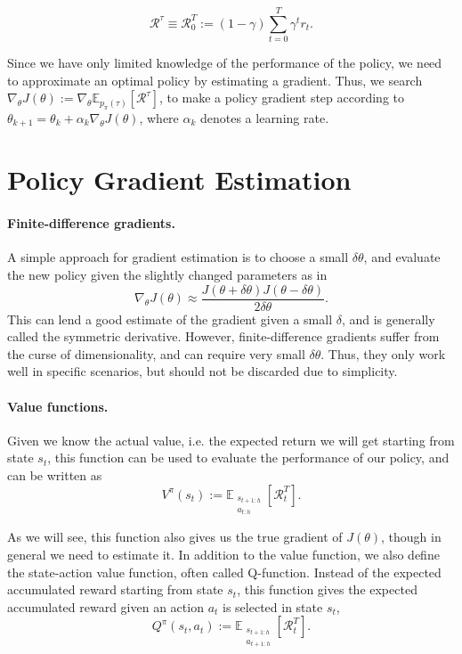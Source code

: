 \begin{equation}
  \mathcal{R}^\tau \equiv \mathcal{R}_0^T := (1-\gamma) \sum_{t=0}^{T} \gamma^t r_t.
  \label{eqn:acc-reward}
\end{equation}

Since we have only limited knowledge of the performance of the policy, we need to approximate an optimal policy by estimating a gradient. 
Thus, we search $\nabla_\theta J(\theta) := \nabla_\theta \mathbb{E}_{p_\pi(\tau)}\left[\mathcal{R}^\tau\right]$, to make a policy gradient step according to $\theta_{k+1} = \theta_k + \alpha_k \nabla_\theta J(\theta)$, where $\alpha_k$ denotes a learning rate. 

\section{Policy Gradient Estimation}
\label{sec:pge}

\paragraph{Finite-difference gradients.} 
A simple approach for gradient estimation is to choose a small $\delta\theta$, and evaluate the new policy given the slightly changed parameters as in 
\begin{equation}
	\nabla_\theta J(\theta) \approx \frac{J(\theta+\delta\theta)J(\theta-\delta\theta)}{2\delta\theta}.
\end{equation} 
This can lend a good estimate of the gradient given a small $\delta$, and is generally called the symmetric derivative. 
However, finite-difference gradients suffer from the curse of dimensionality, and can require very small $\delta\theta$.
Thus, they only work well in specific scenarios, but should not be discarded due to simplicity. 

\paragraph{Value functions.} 
Given we know the actual value, i.e. the expected return we will get starting from state $s_t$, this function can be used to evaluate the performance of our policy, and can be written as
\begin{equation}
	V^{\pi}(s_t) := \mathbb{E}_{\substack{s_{t+1:h} \\ a_{t:h}}}\left[\mathcal{R}_t^T\right].
	\label{eqn:v}
\end{equation}

As we will see, this function also gives us the true gradient of $J(\theta)$, though in general we need to estimate it. 
In addition to the value function, we also define the state-action value function, often called Q-function. 
Instead of the expected accumulated reward starting from state $s_t$, this function gives the expected accumulated reward given an action $a_t$ is selected in state $s_t$, 
\begin{equation}
	Q^{\pi}(s_t, a_t) := \mathbb{E}_{\substack{s_{t+1:h} \\ a_{t+1:h}}}\left[\mathcal{R}_t^T\right].
	\label{eqn:q}
\end{equation}

